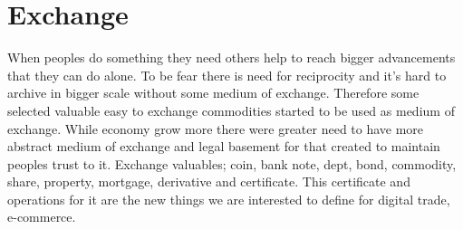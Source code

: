 \section{Exchange}
\label{exhange}
When peoples do something they need others help to reach bigger advancements
that they can do alone. To be fear there is need for reciprocity and it's hard
to archive in bigger scale without some medium of exchange. Therefore some
selected valuable easy to exchange commodities started to be used as medium of
exchange. While economy grow more there were greater need to have more
abstract medium of exchange and legal basement for that created to maintain
peoples trust to it. Exchange valuables; coin, bank note, dept, bond,
commodity, share, property, mortgage, derivative and certificate. This
certificate and operations for it are the new things we are interested to
define for digital trade, e-commerce.




